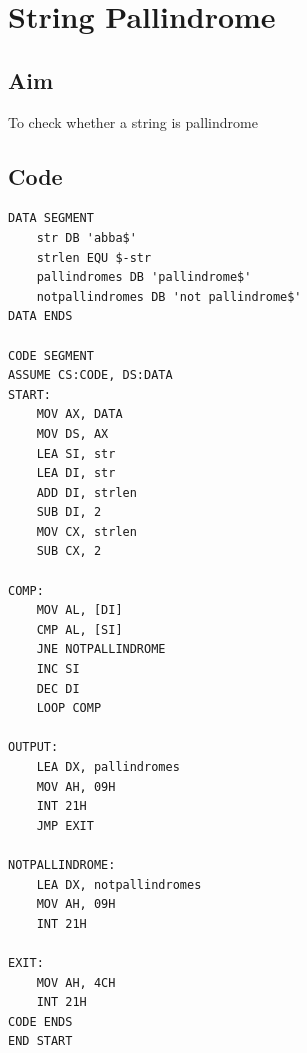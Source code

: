 \section{String Pallindrome}
\subsection{Aim}
To check whether a string is pallindrome

\subsection{Code}
\begin{lstlisting}
DATA SEGMENT
    str DB 'abba$'
    strlen EQU $-str
    pallindromes DB 'pallindrome$'
    notpallindromes DB 'not pallindrome$'
DATA ENDS

CODE SEGMENT
ASSUME CS:CODE, DS:DATA
START:
    MOV AX, DATA
    MOV DS, AX
    LEA SI, str
    LEA DI, str
    ADD DI, strlen
    SUB DI, 2 
    MOV CX, strlen
    SUB CX, 2

COMP:
    MOV AL, [DI]
    CMP AL, [SI]
    JNE NOTPALLINDROME
    INC SI
    DEC DI
    LOOP COMP

OUTPUT:   
    LEA DX, pallindromes
    MOV AH, 09H
    INT 21H
    JMP EXIT
    
NOTPALLINDROME:
    LEA DX, notpallindromes
    MOV AH, 09H
    INT 21H
    
EXIT:
    MOV AH, 4CH
    INT 21H
CODE ENDS
END START

\end{lstlisting}

